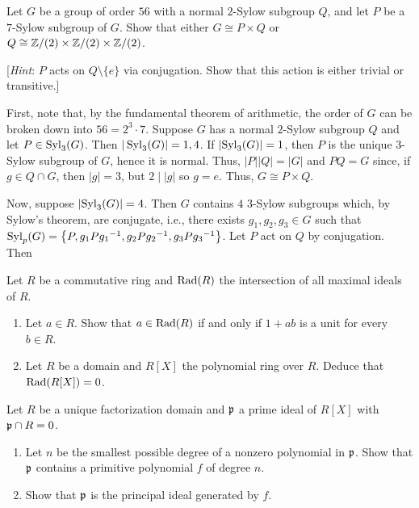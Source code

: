 \begin{problem}
  Let $G$ be a group of order $56$ with a normal $2$-Sylow subgroup $Q$,
  and let $P$ be a $7$-Sylow subgroup of $G$. Show that either $G\cong
  P\times Q$ or $Q\cong\mathbb{Z}/(2)\times\mathbb{Z}/(2)\times\mathbb{Z}/(2)$.

  [\emph{Hint}: $P$ acts on $Q\setminus\{e\}$ via conjugation. Show
  that this action is either trivial or transitive.]
\end{problem}
\begin{solution}
  First, note that, by the fundamental theorem of arithmetic, the order of
  $G$ can be broken down into $56=2^3 \cdot 7$. Suppose $G$ has a normal
  $2$-Sylow subgroup $Q$ and let $P\in\operatorname{Syl}_3(G)$. Then
  $|\operatorname{Syl}_3(G)|=1,4$. If $|{\operatorname{Syl}_3(G)}|=1$, then $P$ is the unique $3$-Sylow
  subgroup of $G$, hence it is normal. Thus, $|P||Q|=|G|$ and $PQ=G$ since,
  if $g\in Q\cap G$, then $|g|=3$, but $2\mid |g|$ so $g=e$. Thus, $G\cong
  P\times Q$.

  Now, suppose $|{\operatorname{Syl}_3(G)}|=4$. Then $G$ contains $4$ $3$-Sylow subgroups
  which, by Sylow's theorem, are conjugate, i.e., there exists
  $g_1,g_2,g_3\in G$ such that
  $\operatorname{Syl}_p(G)=\left\{P,g_1P{g_1}^{-1},g_2P{g_2}^{-1},g_3P{g_3}^{-1}\right\}$. Let
  $P$ act on $Q$ by conjugation. Then
\end{solution}

\begin{problem}
  Let $R$ be a commutative ring and $\operatorname{Rad}(R)$ the intersection of all
  maximal ideals of $R$.
  \begin{enumerate}[label=(\alph*),noitemsep]
  \item Let $a\in R$. Show that $a\in\operatorname{Rad}(R)$ if and only if $1+ab$ is a
    unit for every $b\in R$.
  \item Let $R$ be a domain and $R[X]$ the polynomial ring over
    $R$. Deduce that $\operatorname{Rad}(R[X])=0$.
  \end{enumerate}
\end{problem}
\begin{solution}
\end{solution}

\begin{problem}
  Let $R$ be a unique factorization domain and $\mathfrak{p}$ a prime ideal of $R[X]$
  with $\mathfrak{p}\cap R=0$.
  \begin{enumerate}[label=(\alph*),noitemsep]
  \item Let $n$ be the smallest possible degree of a nonzero polynomial in
    $\mathfrak{p}$. Show that $\mathfrak{p}$ contains a primitive polynomial $f$ of
    degree $n$.
  \item Show that $\mathfrak{p}$ is the principal ideal generated by $f$.
  \end{enumerate}
\end{problem}
\begin{solution}
\end{solution}

